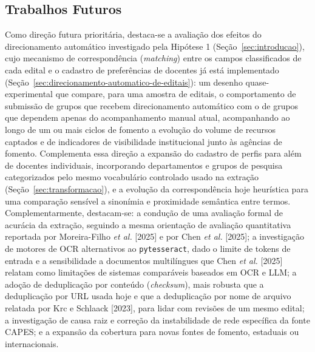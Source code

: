 \documentclass[12pt]{article}
\begin{document}
  \subsection{Trabalhos Futuros}\label{sec:trabalhos-futuros}
  Como direção futura prioritária, destaca-se a avaliação dos efeitos do direcionamento automático investigado pela Hipótese 1 (Seção~\ref{sec:introducao}), cujo mecanismo de correspondência (\emph{matching}) entre os campos classificados de cada edital e o cadastro de preferências de docentes já está implementado (Seção~\ref{sec:direcionamento-automatico-de-editais}): um desenho quase-experimental que compare, para uma amostra de editais, o comportamento de submissão de grupos que recebem direcionamento automático com o de grupos que dependem apenas do acompanhamento manual atual, acompanhando ao longo de um ou mais ciclos de fomento a evolução do volume de recursos captados e de indicadores de visibilidade institucional junto às agências de fomento. Complementa essa direção a expansão do cadastro de perfis para além de docentes individuais, incorporando departamentos e grupos de pesquisa categorizados pelo mesmo vocabulário controlado usado na extração (Seção~\ref{sec:transformacao}), e a evolução da correspondência hoje heurística para uma comparação sensível a sinonímia e proximidade semântica entre termos. Complementarmente, destacam-se: a condução de uma avaliação formal de acurácia da extração, seguindo a mesma orientação de avaliação quantitativa reportada por Moreira-Filho \emph{et al.} [2025] e por Chen \emph{et al.} [2025]; a investigação de motores de OCR alternativos ao \texttt{pytesseract}, dado o limite de tokens de entrada e a sensibilidade a documentos multilíngues que Chen \emph{et al.} [2025] relatam como limitações de sistemas comparáveis baseados em OCR e LLM; a adoção de deduplicação por conteúdo (\emph{checksum}), mais robusta que a deduplicação por URL usada hoje e que a deduplicação por nome de arquivo relatada por Krc e Schlaack [2023], para lidar com revisões de um mesmo edital; a investigação de causa raiz e correção da instabilidade de rede específica da fonte CAPES; e a expansão da cobertura para novas fontes de fomento, estaduais ou internacionais.
\end{document}
